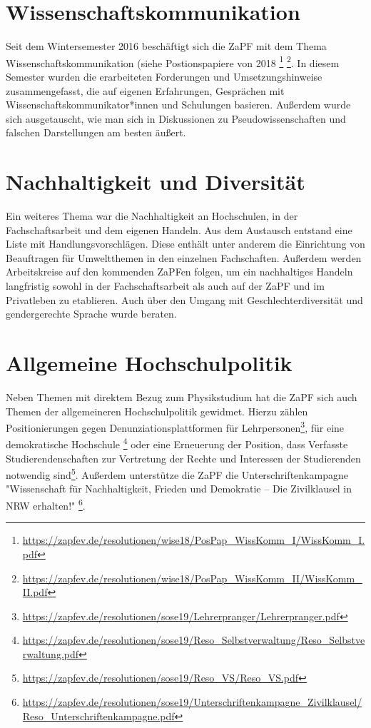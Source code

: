 \section*{Wissenschaftskommunikation}

Seit dem Wintersemester 2016 beschäftigt sich die ZaPF mit dem Thema  Wissenschaftskommunikation (siehe Postionspapiere von 2018 \footnote{\url{https://zapfev.de/resolutionen/wise18/PosPap_WissKomm_I/WissKomm_I.pdf}} \footnote{\url{https://zapfev.de/resolutionen/wise18/PosPap_WissKomm_II/WissKomm_II.pdf}}.
In diesem Semester wurden die erarbeiteten Forderungen und Umsetzungshinweise  zusammengefasst, die auf eigenen Erfahrungen, Gesprächen mit Wissenschaftskommunikator*innen und Schulungen basieren.
Außerdem wurde sich ausgetauscht, wie man sich in Diskussionen zu Pseudowissenschaften und falschen Darstellungen am besten äußert.

\section*{Nachhaltigkeit und Diversität}

Ein weiteres Thema war die Nachhaltigkeit an Hochschulen, in der Fachschaftsarbeit und dem eigenen Handeln.
Aus dem Austausch entstand eine Liste mit Handlungsvorschlägen. Diese enthält unter anderem die Einrichtung von Beauftragen für Umweltthemen in den einzelnen Fachschaften.
Außerdem werden Arbeitskreise auf den kommenden ZaPFen folgen, um ein nachhaltiges Handeln langfristig sowohl in der Fachschaftsarbeit als auch auf der ZaPF und im Privatleben zu etablieren.
Auch über den Umgang mit Geschlechterdiversität und gendergerechte Sprache wurde beraten.

\section*{Allgemeine Hochschulpolitik}

Neben Themen mit direktem Bezug zum Physikstudium hat die ZaPF sich auch Themen der allgemeineren Hochschulpolitik gewidmet. 
Hierzu zählen Positionierungen gegen Denunziationsplattformen für Lehrpersonen\footnote{\url{https://zapfev.de/resolutionen/sose19/Lehrerpranger/Lehrerpranger.pdf}},
für eine demokratische Hochschule
\footnote{\url{https://zapfev.de/resolutionen/sose19/Reso_Selbstverwaltung/Reso_Selbstverwaltung.pdf}}
oder eine Erneuerung der Position, dass Verfasste Studierendenschaften zur Vertretung der Rechte und Interessen der Studierenden notwendig sind\footnote{\url{https://zapfev.de/resolutionen/sose19/Reso_VS/Reso_VS.pdf}}.
Außerdem unterstütze die ZaPF die Unterschriftenkampagne "Wissenschaft für Nachhaltigkeit, Frieden
und Demokratie – Die Zivilklausel in NRW erhalten!"
\footnote{\url{https://zapfev.de/resolutionen/sose19/Unterschriftenkampagne_Zivilklausel/Reso_Unterschriftenkampagne.pdf}}.

